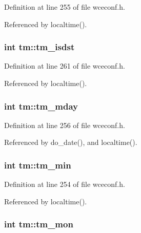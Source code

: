 Definition at line 255 of file wceconf.\+h.



Referenced by localtime().

\hypertarget{structtm_a5645ca0580c8ab2c24f6c2965d9c9f9c}{
\subsubsection[{tm\+\_\+isdst}]{\setlength{\rightskip}{0pt plus 5cm}int tm\+::tm\+\_\+isdst}}\label{structtm_a5645ca0580c8ab2c24f6c2965d9c9f9c}


Definition at line 261 of file wceconf.\+h.



Referenced by localtime().

\hypertarget{structtm_ab8d8904bad43b0c8b96e61941c5b5310}{
\subsubsection[{tm\+\_\+mday}]{\setlength{\rightskip}{0pt plus 5cm}int tm\+::tm\+\_\+mday}}\label{structtm_ab8d8904bad43b0c8b96e61941c5b5310}


Definition at line 256 of file wceconf.\+h.



Referenced by do\+\_\+date(), and localtime().

\hypertarget{structtm_af414eb7c86cc3099595211eee4d4211b}{
\subsubsection[{tm\+\_\+min}]{\setlength{\rightskip}{0pt plus 5cm}int tm\+::tm\+\_\+min}}\label{structtm_af414eb7c86cc3099595211eee4d4211b}


Definition at line 254 of file wceconf.\+h.



Referenced by localtime().

\hypertarget{structtm_a112ac36fa2f593777138a417cf031e17}{
\subsubsection[{tm\+\_\+mon}]{\setlength{\rightskip}{0pt plus 5cm}int tm\+::tm\+\_\+mon}}\label{structtm_a112ac36fa2f593777138a417cf031e17}


